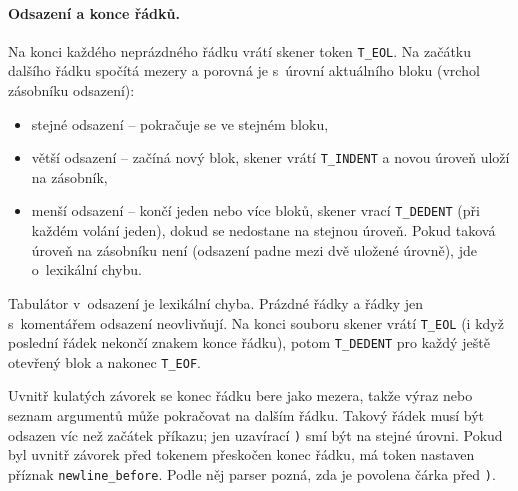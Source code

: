 \paragraph{Odsazení a konce řádků.}
Na konci každého neprázdného řádku vrátí skener token \texttt{T\_EOL}.
Na začátku dalšího řádku spočítá mezery a porovná je s~úrovní aktuálního
bloku (vrchol zásobníku odsazení):
\begin{itemize}
  \item stejné odsazení -- pokračuje se ve stejném bloku,
  \item větší odsazení -- začíná nový blok, skener vrátí \texttt{T\_INDENT}
        a novou úroveň uloží na zásobník,
  \item menší odsazení -- končí jeden nebo více bloků, skener vrací
        \texttt{T\_DEDENT} (při každém volání jeden), dokud se nedostane na
        stejnou úroveň. Pokud taková úroveň na zásobníku není (odsazení
        padne mezi dvě uložené úrovně), jde o~lexikální chybu.
\end{itemize}
Tabulátor v~odsazení je lexikální chyba. Prázdné řádky a řádky jen
s~komentářem odsazení neovlivňují. Na konci souboru skener vrátí
\texttt{T\_EOL} (i když poslední řádek nekončí znakem konce řádku),
potom \texttt{T\_DEDENT} pro každý ještě otevřený blok a nakonec
\texttt{T\_EOF}.

Uvnitř kulatých závorek se konec řádku bere jako mezera, takže výraz nebo
seznam argumentů může pokračovat na dalším řádku. Takový řádek musí být
odsazen víc než začátek příkazu; jen uzavírací \texttt{)} smí být na stejné
úrovni. Pokud byl uvnitř závorek před tokenem přeskočen konec řádku, má
token nastaven příznak \texttt{newline\_before}. Podle něj parser pozná,
zda je povolena čárka před \texttt{)}.

